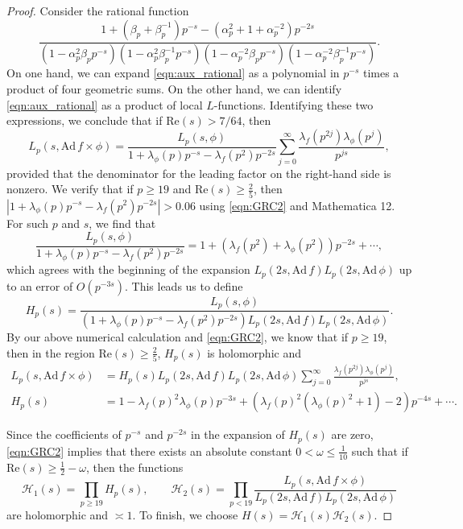 \documentclass[10pt,a4paper]{amsart}
\begin{document}
\begin{proof}
Consider the rational function
\begin{equation}
\label{eqn:aux_rational}
\frac{1+(\beta_p+\beta_p^{-1})p^{-s}-(\alpha_p^2+1+\alpha_p^{-2})p^{-2s}}{(1-\alpha_p^2 \beta_p p^{-s})(1-\alpha_p^2 \beta_p^{-1}p^{-s})(1-\alpha_p^{-2} \beta_p p^{-s})(1-\alpha_p^{-2} \beta_p^{-1}p^{-s})}.
\end{equation}
On one hand, we can expand \eqref{eqn:aux_rational} as a polynomial in $p^{-s}$ times a product of four geometric sums.  On the other hand, we can identify \eqref{eqn:aux_rational} as a product of local $L$-functions.  Identifying these two expressions, we conclude that if $\mathrm{Re}(s)>7/64$, then
\begin{equation}
\label{eqn:key}
L_p(s,\mathrm{Ad}\,f\times\phi)=\frac{L_p(s,\phi)}{1+\lambda_{\phi}(p)p^{-s}-\lambda_{f}(p^2)p^{-2s}}\sum_{j=0}^{\infty}\frac{\lambda_{f}(p^{2j})\lambda_{\phi}(p^j)}{p^{js}},
\end{equation}
provided that the denominator for the leading factor on the right-hand side is nonzero.  We verify that if $p\geq 19$ and $\mathrm{Re}(s)\geq \frac{2}{5}$, then $|1+\lambda_{\phi}(p)p^{-s}-\lambda_{f}(p^2)p^{-2s}|>0.06$ using \eqref{eqn:GRC2} and Mathematica 12.  For such $p$ and $s$, we find that
\begin{equation}
\label{eqn:G_def}
\frac{L_p(s,\phi)}{1+\lambda_{\phi}(p)p^{-s}-\lambda_{f}(p^2)p^{-2s}}=1+(\lambda_{f}(p^2)+\lambda_{\phi}(p^2))p^{-2s} +\cdots,
\end{equation}
which agrees with the beginning of the expansion $L_p(2s,\mathrm{Ad}\,f)L_{p}(2s,\mathrm{Ad}\,\phi)$ up to an error of $O(p^{-3s})$. This leads us to define
\[
H_p(s) = \frac{L_p(s,\phi)}{(1+\lambda_{\phi}(p)p^{-s}-\lambda_{f}(p^2)p^{-2s})L_p(2s,\mathrm{Ad}\, f)L_p(2s,\mathrm{Ad}\,\phi)}.
\]
By our above numerical calculation and \eqref{eqn:GRC2}, we know that if $p\geq 19$,  then in the region $\mathrm{Re}(s)\geq \frac{2}{5}$, $H_p(s)$ is holomorphic and
\begin{align*}
L_p(s,\mathrm{Ad}\,f\times\phi) &= H_p(s)L_p(2s,\mathrm{Ad}\, f)L_p(2s,\mathrm{Ad}\,\phi)\sum_{j=0}^{\infty}\frac{\lambda_{f}(p^{2j})\lambda_{\phi}(p^j)}{p^{js}},\\
H_p(s)&=1-\lambda_{f}(p)^2\lambda_{\phi}(p)p^{-3s}+(\lambda_{f}(p)^2(\lambda_{\phi}(p)^2+1)-2)p^{-4s}+\cdots.
\end{align*}

Since the coefficients of $p^{-s}$ and $p^{-2s}$ in the expansion of $H_p(s)$ are zero, \eqref{eqn:GRC2} implies that there exists an absolute constant $0<\omega\leq\frac{1}{10}$ such that if $\mathrm{Re}(s)\geq \frac{1}{2}-\omega$, then the functions
\[
\mathcal{H}_1(s)=\prod_{p\geq 19}H_p(s),\qquad \mathcal{H}_2(s) = \prod_{p<19}\frac{L_p(s,\mathrm{Ad}\,f\times\phi)}{L_p(2s,\mathrm{Ad}\,f)L_p(2s,\mathrm{Ad}\,\phi)}
\]
are holomorphic and $\asymp 1$.  To finish, we choose $H(s) = \mathcal{H}_1(s)\mathcal{H}_2(s)$.
\end{proof}
\end{document}

